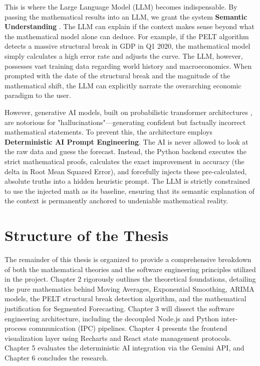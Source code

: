 \documentclass[11pt, a4paper]{report}
\begin{document}
This is where the Large Language Model (LLM) becomes indispensable. By passing the mathematical results into an LLM, we grant the system \textbf{Semantic Understanding} \cite{Korinek2025}. The LLM can explain if the context makes sense beyond what the mathematical model alone can deduce. For example, if the PELT algorithm detects a massive structural break in GDP in Q1 2020, the mathematical model simply calculates a high error rate and adjusts the curve. The LLM, however, possesses vast training data regarding world history and macroeconomics. When prompted with the date of the structural break and the magnitude of the mathematical shift, the LLM can explicitly narrate the overarching economic paradigm to the user.

However, generative AI models, built on probabilistic transformer architectures \cite{Vaswani2017}, are notorious for "hallucinations"—generating confident but factually incorrect mathematical statements. To prevent this, the architecture employs \textbf{Deterministic AI Prompt Engineering}. The AI is never allowed to look at the raw data and guess the forecast. Instead, the Python backend executes the strict mathematical proofs, calculates the exact improvement in accuracy (the delta in Root Mean Squared Error), and forcefully injects these pre-calculated, absolute truths into a hidden heuristic prompt. The LLM is strictly constrained to use the injected math as its baseline, ensuring that its semantic explanation of the context is permanently anchored to undeniable mathematical reality.

\section{Structure of the Thesis}
The remainder of this thesis is organized to provide a comprehensive breakdown of both the mathematical theories and the software engineering principles utilized in the project. Chapter 2 rigorously outlines the theoretical foundations, detailing the pure mathematics behind Moving Averages, Exponential Smoothing, ARIMA models, the PELT structural break detection algorithm, and the mathematical justification for Segmented Forecasting. Chapter 3 will dissect the software engineering architecture, including the decoupled Node.js and Python inter-process communication (IPC) pipelines. Chapter 4 presents the frontend visualization layer using Recharts and React state management protocols. Chapter 5 evaluates the deterministic AI integration via the Gemini API, and Chapter 6 concludes the research.
\end{document}
